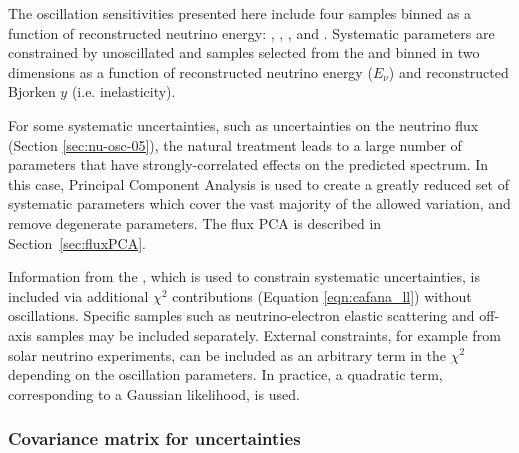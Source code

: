 The  oscillation sensitivities presented here include four   samples binned as a function of reconstructed neutrino energy: \numutonumu, \numubartonumubar, \numutonue, and \numubartonuebar. Systematic parameters are constrained by unoscillated  \numu and \anumu {} samples selected from the   and binned in two dimensions as a function of reconstructed neutrino energy ($E_{\nu}$) and reconstructed Bjorken $y$ (i.e. inelasticity). %


For some systematic uncertainties, such as uncertainties on the neutrino flux (Section \ref{sec:nu-osc-05}), the natural treatment leads to a large number of parameters that have strongly-correlated effects on the predicted spectrum. In this case, Principal Component Analysis is used to create a greatly reduced set of systematic parameters which cover the vast majority of the allowed variation, and remove degenerate parameters. The flux PCA is described in Section~\ref{sec:fluxPCA}.

Information from the , which is used to constrain systematic uncertainties, is included via additional $\chi^2$ contributions (Equation \ref{eqn:cafana_ll}) without oscillations. Specific  samples such as neutrino-electron elastic scattering and off-axis samples may be included separately. %
External constraints, for example from solar neutrino experiments, can be included as an arbitrary term in the $\chi^2$ depending on the oscillation parameters. In practice, a quadratic term, corresponding to a Gaussian likelihood, is used.

\subsubsection{Covariance matrix for  uncertainties}

